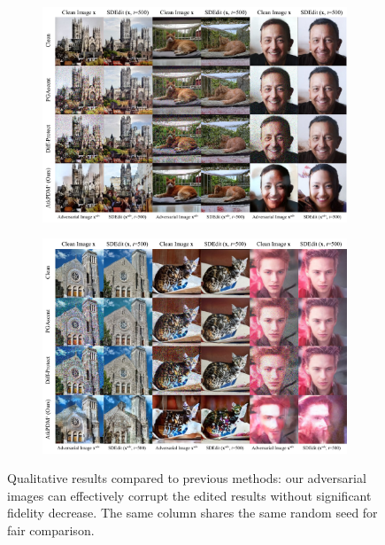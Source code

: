 \begin{figure}
\centering
\begin{subfigure}{1\linewidth}
    \centering
    \includegraphics[width=0.9\linewidth]{figures/qualitative_results_1.pdf}
    \label{fig:qualitative_results_1}
\end{subfigure}

\begin{subfigure}{0.9\linewidth}
    \centering
    \includegraphics[width=1\linewidth]{figures/qualitative_results_2.pdf}
    \label{fig:qualitative_results_2}
\end{subfigure}
\caption{Qualitative results compared to previous methods: our adversarial images can effectively corrupt the edited results without significant fidelity decrease. The same column shares the same random seed for fair comparison.}
\label{supp:qualitative}
\end{figure}

